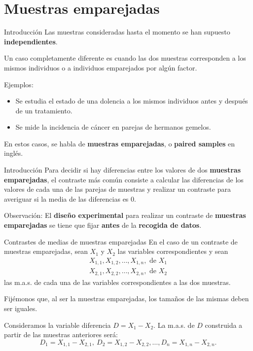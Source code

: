 \documentclass[
  ignorenonframetext,
]{beamer}
\begin{document}
\hypertarget{muestras-emparejadas}{%
\section{Muestras emparejadas}\label{muestras-emparejadas}}

\begin{frame}{Introducción}
\protect\hypertarget{introducciuxf3n-5}{}
Las muestras consideradas hasta el momento se han supuesto
\textbf{independientes}.

Un caso completamente diferente es cuando las dos muestras corresponden
a los mismos individuos o a individuos emparejados por algún factor.

Ejemplos:

\begin{itemize}[<+->]
\item
  Se estudia el estado de una dolencia a los mismos individuos antes y
  después de un tratamiento.
\item
  Se mide la incidencia de cáncer en parejas de hermanos gemelos.
\end{itemize}

En estos casos, se habla de \textbf{muestras emparejadas}, o
\textbf{paired samples} en inglés.
\end{frame}

\begin{frame}{Introducción}
\protect\hypertarget{introducciuxf3n-6}{}
Para decidir si hay diferencias entre los valores de dos
\textbf{muestras emparejadas}, el contraste más común consiste a
calcular las diferencias de los valores de cada una de las parejas de
muestras y realizar un contraste para averiguar si la media de las
diferencias es 0.

Observación: El \textbf{diseño experimental} para realizar un contraste
de \textbf{muestras emparejadas} se tiene que fijar \textbf{antes} de la
\textbf{recogida de datos}.
\end{frame}

\begin{frame}{Contrastes de medias de muestras emparejadas}
\protect\hypertarget{contrastes-de-medias-de-muestras-emparejadas}{}
En el caso de un contraste de muestras emparejadas, sean \(X_1\) y
\(X_2\) las variables correspondientes y sean \[
\begin{array}{l}
X_{1,1}, X_{1,2},\ldots, X_{1,n},\mbox{ de }X_1\\
X_{2,1}, X_{2,2},\ldots, X_{2,n},\mbox{ de }X_2
\end{array}
\] las m.a.s. de cada una de las variables correspondientes a las dos
muestras.

Fijémonos que, al ser la muestras emparejadas, los tamaños de las mismas
deben ser iguales.

Consideramos la variable diferencia \(D=X_1-X_2\). La m.a.s. de \(D\)
construida a partir de las muestras anteriores será: \[
D_1 =X_{1,1}-X_{2,1}, \ D_2=X_{1,2}-X_{2,2},\ldots, D_n=X_{1,n}-X_{2,n}.
\]
\end{frame}
\end{document}
